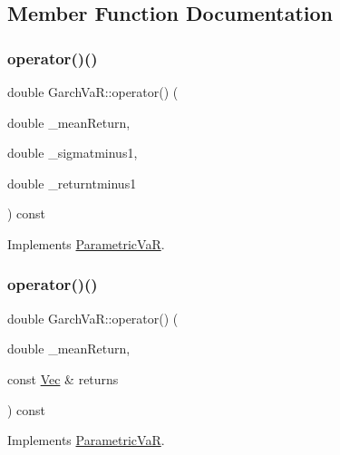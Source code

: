 \subsection{Member Function Documentation}
\hypertarget{classGarchVaR_a6aec8c89e48d2b2f356669ed3300f456}{}\label{classGarchVaR_a6aec8c89e48d2b2f356669ed3300f456} 
\subsubsection{\texorpdfstring{operator()()}{operator()()}\hspace{0.1cm}{\footnotesize\ttfamily [1/3]}}
{\footnotesize\ttfamily double Garch\+Va\+R\+::operator() (\begin{DoxyParamCaption}\item[{double}]{\+\_\+mean\+Return,  }\item[{double}]{\+\_\+sigmatminus1,  }\item[{double}]{\+\_\+returntminus1 }\end{DoxyParamCaption}) const\hspace{0.3cm}{\ttfamily [virtual]}}



Implements \hyperlink{classParametricVaR_a54589e13bb45da786d574656eb67b5fb}{Parametric\+VaR}.

\hypertarget{classGarchVaR_ab7e9583566b26a64017edbbfb63f3e89}{}\label{classGarchVaR_ab7e9583566b26a64017edbbfb63f3e89} 
\subsubsection{\texorpdfstring{operator()()}{operator()()}\hspace{0.1cm}{\footnotesize\ttfamily [2/3]}}
{\footnotesize\ttfamily double Garch\+Va\+R\+::operator() (\begin{DoxyParamCaption}\item[{double}]{\+\_\+mean\+Return,  }\item[{const \hyperlink{compute__returns__eigen_8h_a1eb6a9306ef406d7975f3cbf2e247777}{Vec} \&}]{returns }\end{DoxyParamCaption}) const\hspace{0.3cm}{\ttfamily [virtual]}}



Implements \hyperlink{classParametricVaR_a5fda9d0e1033ff6e93dd112555ee5e0b}{Parametric\+VaR}.

